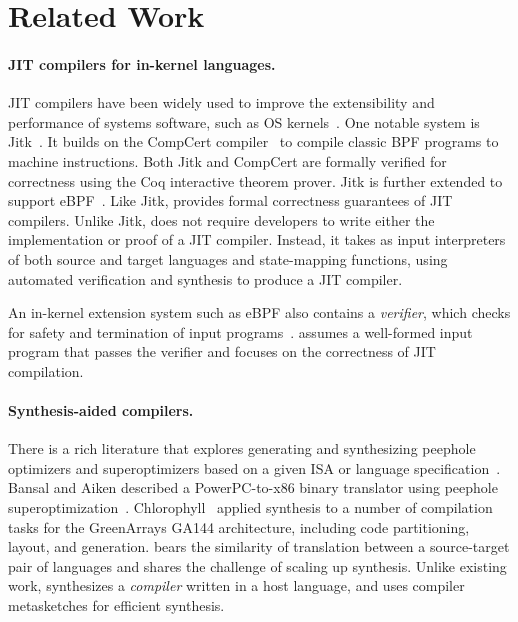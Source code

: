 \section{Related Work}\label{s:related}


\paragraph{JIT compilers for in-kernel languages.}

JIT compilers have been widely used to improve
the extensibility and performance of systems software,
such as OS kernels~\cite{chen:vmsec,engler:vcode,fleming:ebpf,myreen:vjit}.
%
One notable system is Jitk~\cite{wang:jitk}.
It builds on the CompCert compiler~\cite{leroy:compcert}
to compile classic BPF programs to machine instructions.
%
Both Jitk and CompCert are formally verified for correctness
using the Coq interactive theorem prover.  Jitk is further extended
to support eBPF~\cite{sobel:ejitk}.
%
Like Jitk,
\jitsynth provides formal correctness guarantees
of JIT compilers.
Unlike Jitk,
\jitsynth does not require developers to write either the implementation or proof
of a JIT compiler.
Instead,
it takes as input interpreters of both source and target languages
and state-mapping functions,
using automated verification and synthesis to produce a JIT compiler.

An in-kernel extension system such as eBPF
also contains a \emph{verifier},
which checks for safety and termination of input programs~\cite{gershuni:crab-ebpf,wang:jitk}.
\jitsynth assumes a well-formed input program that passes the verifier
and focuses on the correctness of JIT compilation.

\paragraph{Synthesis-aided compilers.}

There is a rich literature that explores generating and synthesizing
peephole optimizers and superoptimizers based on a given ISA or language
specification~\cite{bansal:superopt,davidson:peephole,gulwani:brahma,joshi:denali,massalin:superopt,sasnauskas:souper,schkufza:stoke}.
%
Bansal and Aiken described a PowerPC-to-x86 binary translator using
peephole superoptimization~\cite{bansal:binary}.
%
Chlorophyll~\cite{phothilimthana:chlorophyll} applied synthesis
to a number of compilation tasks for the GreenArrays GA144 architecture,
including code partitioning, layout, and generation.
%
\jitsynth bears the similarity of translation between a source-target pair
of languages and shares the challenge of scaling up synthesis.
%
Unlike existing work,
\jitsynth synthesizes a \emph{compiler} written in a host language,
and uses compiler metasketches for efficient synthesis.

